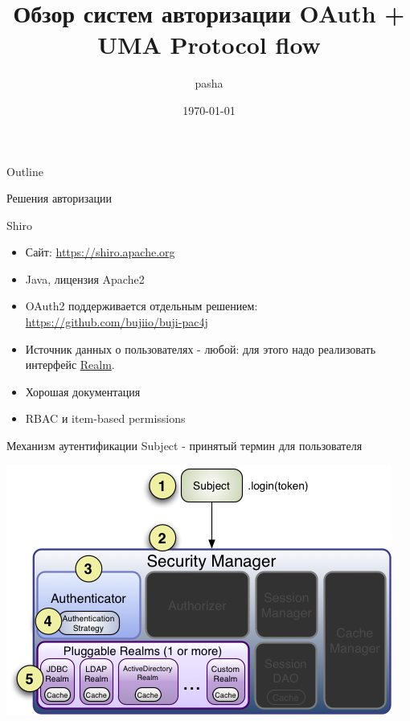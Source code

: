 \documentclass[presentation]{beamer}
\author{pasha}
\date{\today}
\title{Обзор систем авторизации OAuth + UMA Protocol flow}
\begin{document}
\maketitle
\begin{frame}{Outline}
\tableofcontents
\end{frame}


\begin{frame}[label={sec:org24b9295},fragile]{Решения авторизации}
 \begin{block}{Shiro}
\begin{itemize}
\item Сайт: \url{https://shiro.apache.org}
\item Java, лицензия Apache2
\item OAuth2 поддерживается отдельным решением: \url{https://github.com/bujiio/buji-pac4j}
\item Источник данных о пользователях - любой: для этого надо реализовать интерфейс \href{https://shiro.apache.org/realm.html}{Realm}.
\item Хорошая документация
\item RBAC и item-based permissions
\end{itemize}

\begin{block}{Механизм аутентификации}
\alert{Subject} - принятый термин для пользователя

\begin{center}
\includegraphics[width=.9\linewidth]{./img/ShiroAuthenticationSequence.png}
\end{center}


\end{block}
\end{block}
\end{frame}
\end{document}
